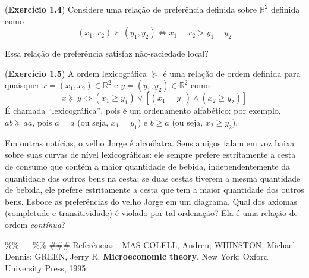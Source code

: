 \documentclass[12pt]{article}
\begin{document}
(\textbf{Exercício 1.4}) Considere uma relação de preferência definida
sobre \(\mathbb{R}^2\) definida como \[
(x_{1},x_{2}) \succ (y_{1}, y_{2}) \iff x_{1}+x_{2} > y_{1}+y_{2}
\]

Essa relação de preferência satisfaz não-saciedade local?

(\textbf{Exercício 1.5}) A ordem lexicográfica \(\succeq\) é uma relação
de ordem definida para quaisquer \(x=(x_{1},x_{2}) \in \mathbb{R}^{2}\)
e \(y =(y_{1},y_{2})\in \mathbb{R}^{2}\) como \[
x \succeq y \iff (x_{1} \geq y_{1}) \lor [(x_{1} = y_{1}) \land (x_{2} \geq y_{2})]
\] É chamada ``lexicográfica'', pois é um ordenamento alfabético: por
exemplo, \(ab \succeq aa\), pois \(a=a\) (ou seja, \(x_{1}=y_{1}\)) e
\(b\geq a\) (ou seja, \(x_{2}\geq y_{2}\)).

Em outras notícias, o velho Jorge é alcoólatra. Seus amigos falam em voz
baixa sobre suas curvas de nível lexicográficas: ele sempre prefere
estritamente a cesta de consumo que contém a maior quantidade de bebida,
independentemente da quantidade dos outros bens na cesta; se duas cestas
tiverem a mesma quantidade de bebida, ele prefere estritamente a cesta
que tem a maior quantidade dos outros bens. Esboce as preferências do
velho Jorge em um diagrama. Qual dos axiomas (completude e
transitividade) é violado por tal ordenação? Ela é uma relação de ordem
\emph{contínua}?

\%\% --- \%\% \#\#\# Referências - MAS-COLELL, Andreu; WHINSTON, Michael
Dennis; GREEN, Jerry R. \textbf{Microeconomic theory}. New York: Oxford
University Press, 1995.

\printbibliography
\end{document}
